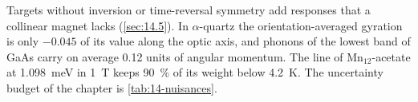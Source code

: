 Targets without inversion or time-reversal symmetry add responses that a collinear magnet lacks (\cref{sec:14.5}). In $\alpha$-quartz the orientation-averaged gyration is only $-0.045$ of its value along the optic axis, and phonons of the lowest band of GaAs carry on average 0.12 units of angular momentum. The line of Mn$_{12}$-acetate at \SI{1.098}{meV} in \SI{1}{T} keeps \SI{90}{\percent} of its weight below \SI{4.2}{K}. The uncertainty budget of the chapter is \cref{tab:14-nuisances}.
